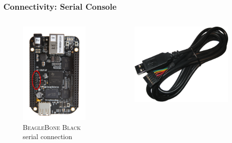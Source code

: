 \begin{frame}
  \frametitle{Connectivity: Serial Console}
  \begin{columns}
    \begin{figure}
      \centering
      \includegraphics[scale=0.5]{images/bbb-serial.png}
      \caption{\textsc{BeagleBone Black} serial connection}
    \end{figure}
    \begin{figure}
      \centering
      \includegraphics[scale=0.3]{images/ftdi-cable.png}

\end{figure}
\end{columns}
\end{frame}

